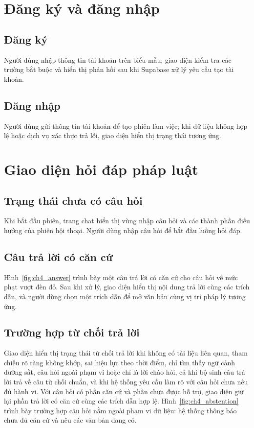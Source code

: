 \documentclass[12pt,a4paper,oneside]{report}
\begin{document}
\section{Đăng ký và đăng nhập}
\subsection{Đăng ký}
Người dùng nhập thông tin tài khoản trên biểu mẫu; giao diện kiểm tra các trường bắt buộc và hiển thị phản hồi sau khi Supabase xử lý yêu cầu tạo tài khoản.
\subsection{Đăng nhập}
Người dùng gửi thông tin tài khoản để tạo phiên làm việc; khi dữ liệu không hợp lệ hoặc dịch vụ xác thực trả lỗi, giao diện hiển thị trạng thái tương ứng.

\section{Giao diện hỏi đáp pháp luật}
\subsection{Trạng thái chưa có câu hỏi}
Khi bắt đầu phiên, trang chat hiển thị vùng nhập câu hỏi và các thành phần điều hướng của phiên hội thoại. Người dùng nhập câu hỏi để bắt đầu luồng hỏi đáp.

\subsection{Câu trả lời có căn cứ}
Hình~\ref{fig:ch4_answer} trình bày một câu trả lời có căn cứ cho câu hỏi về mức phạt vượt đèn đỏ.
Sau khi xử lý, giao diện hiển thị nội dung trả lời cùng các trích dẫn, và người dùng chọn một trích dẫn để mở văn bản cùng vị trí pháp lý tương ứng.
\subsection{Trường hợp từ chối trả lời}
Giao diện hiển thị trạng thái từ chối trả lời khi không có tài liệu liên quan, tham chiếu rõ ràng không khớp, sai hiệu lực theo thời điểm, chỉ tìm thấy ngữ cảnh đường sắt, câu hỏi ngoài phạm vi hoặc chỉ là lời chào hỏi, cả khi bộ sinh câu trả lời trả về câu từ chối chuẩn, và khi hệ thống yêu cầu làm rõ với câu hỏi chưa nêu đủ hành vi. Với câu hỏi có phần căn cứ và phần chưa được hỗ trợ, giao diện giữ lại phần trả lời có căn cứ cùng các trích dẫn hợp lệ.
Hình~\ref{fig:ch4_abstention} trình bày trường hợp câu hỏi nằm ngoài phạm vi dữ liệu: hệ thống thông báo chưa đủ căn cứ và nêu các văn bản đang có.
\end{document}
